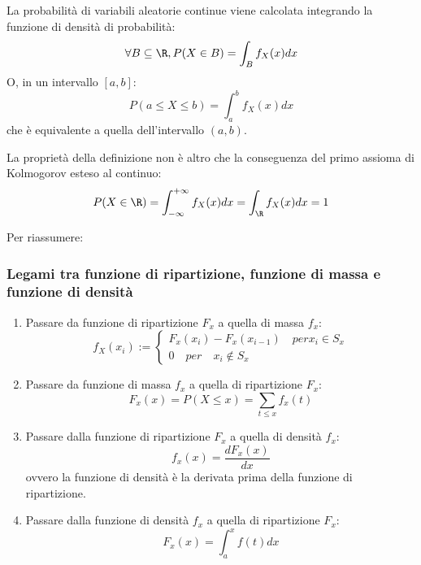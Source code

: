 \begin{defin}
La probabilità di variabili aleatorie continue viene calcolata integrando la funzione di densità di probabilità:
\begin{equation*}
	\forall B\subseteq\R, P(X\in B)=\int_B f_X(x)dx
\end{equation*}
O, in un intervallo $[a,b]$:
\begin{equation*}
	P(a\leq X\leq b)=\int_a^b f_X(x)dx
\end{equation*}
che è equivalente a quella dell'intervallo $(a,b)$.

La proprietà della definizione non è altro che la conseguenza del primo assioma di Kolmogorov esteso al continuo:
\begin{equation*}
	P(X\in\R) = \int_{-\infty}^{+\infty} f_X(x)dx = \int_\R f_X(x)dx = 1
\end{equation*}
\end{defin}


Per riassumere:
\subsubsection{Legami tra funzione di ripartizione, funzione di massa e funzione di densità}
\begin{enumerate}
\item Passare da funzione di ripartizione $F_x$  a quella di massa $f_x$:
\begin{equation*}
f_X(x_i) := \begin{cases}
F_x(x_i) - F_x(x_{i-1}) \quad per x_i \in S_x\\
0 \quad per \quad x_i \notin S_x
\end{cases}
\end{equation*}

\item Passare da funzione di massa $f_x$ a quella di ripartizione $F_x$:
\begin{equation*}
F_x (x) = P(X \leq x) = \sum_{t\leq x}f_x(t)
\end{equation*}

\item Passare dalla funzione di ripartizione $F_x$ a quella di densità $f_x$:
\begin{equation*}
f_x(x) = \frac{d F_x(x)}{dx}
\end{equation*}
ovvero la funzione di densità è la derivata prima della funzione di ripartizione.

\item Passare dalla funzione di densità $f_x$ a quella di ripartizione $F_x$:
\begin{equation*}
F_x(x) = \int_a^x f(t)dx
\end{equation*}
\end{enumerate}




